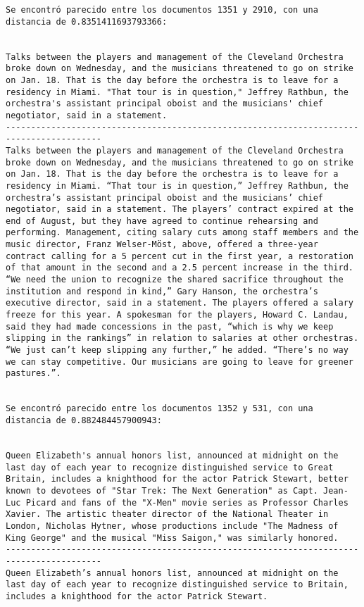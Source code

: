 \documentclass[11pt]{article}
\begin{document}
\begin{Verbatim}[commandchars=\\\{\}]
Se encontró parecido entre los documentos 1351 y 2910, con una distancia de 0.8351411693793366:


Talks between the players and management of the Cleveland Orchestra broke down on Wednesday, and the musicians threatened to go on strike on Jan. 18. That is the day before the orchestra is to leave for a residency in Miami. "That tour is in question," Jeffrey Rathbun, the orchestra's assistant principal oboist and the musicians' chief negotiator, said in a statement.
-----------------------------------------------------------------------------------------
Talks between the players and management of the Cleveland Orchestra broke down on Wednesday, and the musicians threatened to go on strike on Jan. 18. That is the day before the orchestra is to leave for a residency in Miami. “That tour is in question,” Jeffrey Rathbun, the orchestra’s assistant principal oboist and the musicians’ chief negotiator, said in a statement. The players’ contract expired at the end of August, but they have agreed to continue rehearsing and performing. Management, citing salary cuts among staff members and the music director, Franz Welser-Möst, above, offered a three-year contract calling for a 5 percent cut in the first year, a restoration of that amount in the second and a 2.5 percent increase in the third. “We need the union to recognize the shared sacrifice throughout the institution and respond in kind,” Gary Hanson, the orchestra’s executive director, said in a statement. The players offered a salary freeze for this year. A spokesman for the players, Howard C. Landau, said they had made concessions in the past, “which is why we keep slipping in the rankings” in relation to salaries at other orchestras. “We just can’t keep slipping any further,” he added. “There’s no way we can stay competitive. Our musicians are going to leave for greener pastures.”.


Se encontró parecido entre los documentos 1352 y 531, con una distancia de 0.882484457900943:


Queen Elizabeth's annual honors list, announced at midnight on the last day of each year to recognize distinguished service to Great Britain, includes a knighthood for the actor Patrick Stewart, better known to devotees of "Star Trek: The Next Generation" as Capt. Jean-Luc Picard and fans of the "X-Men" movie series as Professor Charles Xavier. The artistic theater director of the National Theater in London, Nicholas Hytner, whose productions include "The Madness of King George" and the musical "Miss Saigon," was similarly honored.
-----------------------------------------------------------------------------------------
Queen Elizabeth’s annual honors list, announced at midnight on the last day of each year to recognize distinguished service to Britain, includes a knighthood for the actor Patrick Stewart.



\end{Verbatim}
\end{document}
